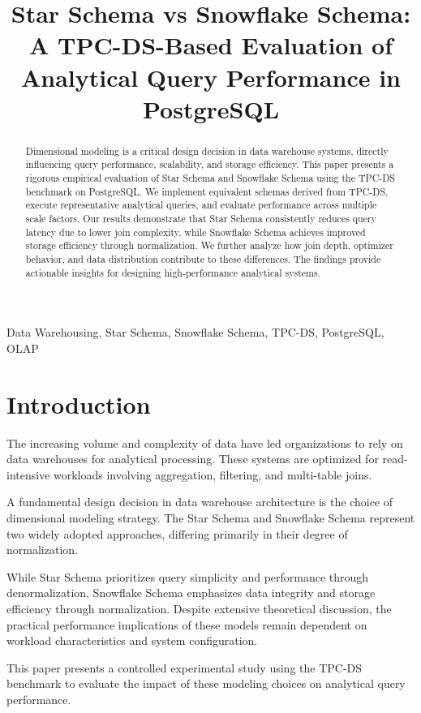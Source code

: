 \documentclass[conference]{IEEEtran}
\title{Star Schema vs Snowflake Schema: A TPC-DS-Based Evaluation of Analytical Query Performance in PostgreSQL}
\author{
\IEEEauthorblockN{Daniel Correia, Jose Fonseca, Marcelo Andrade, Miguel Silva}
\IEEEauthorblockA{Advanced Exploration and Analysis of Databases\\
Instituto Polit\'ecnico de Viseu, Portugal\\}}
\begin{document}
\maketitle

\begin{abstract}
Dimensional modeling is a critical design decision in data warehouse systems, directly influencing query performance, scalability, and storage efficiency. This paper presents a rigorous empirical evaluation of Star Schema and Snowflake Schema using the TPC-DS benchmark on PostgreSQL. We implement equivalent schemas derived from TPC-DS, execute representative analytical queries, and evaluate performance across multiple scale factors. Our results demonstrate that Star Schema consistently reduces query latency due to lower join complexity, while Snowflake Schema achieves improved storage efficiency through normalization. We further analyze how join depth, optimizer behavior, and data distribution contribute to these differences. The findings provide actionable insights for designing high-performance analytical systems.
\end{abstract}

\begin{IEEEkeywords}
Data Warehousing, Star Schema, Snowflake Schema, TPC-DS, PostgreSQL, OLAP
\end{IEEEkeywords}

\section{Introduction}

The increasing volume and complexity of data have led organizations to rely on data warehouses for analytical processing. These systems are optimized for read-intensive workloads involving aggregation, filtering, and multi-table joins.

A fundamental design decision in data warehouse architecture is the choice of dimensional modeling strategy. The Star Schema and Snowflake Schema represent two widely adopted approaches, differing primarily in their degree of normalization.

While Star Schema prioritizes query simplicity and performance through denormalization, Snowflake Schema emphasizes data integrity and storage efficiency through normalization. Despite extensive theoretical discussion, the practical performance implications of these models remain dependent on workload characteristics and system configuration.

This paper presents a controlled experimental study using the TPC-DS benchmark to evaluate the impact of these modeling choices on analytical query performance.
\end{document}
